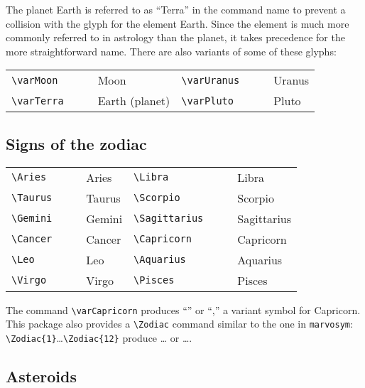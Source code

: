 \documentclass{article}
\newcommand{\showboth}[1]{\starfontsans #1 & \starfontserif #1}
\begin{document}
The planet Earth is referred to as ``Terra'' in the command name to
prevent a collision with the glyph for the element Earth.  Since the
element is much more commonly referred to in astrology than the
planet, it takes precedence for the more straightforward name.  There
are also variants of some of these glyphs:

\begin{tabular}{llll|llll}
\verb|\varMoon| & \showboth{\varMoon} & Moon &
   \verb|\varUranus| & \showboth{\varUranus} & Uranus \\
\verb|\varTerra| & \showboth{\varTerra} & Earth (planet) &
   \verb|\varPluto| & \showboth{\varPluto} & Pluto
\end{tabular}

\subsection{Signs of the zodiac}

\begin{tabular}{llll|llll}
\verb|\Aries| & \showboth{\Aries} & Aries &
   \verb|\Libra| & \showboth{\Libra} & Libra \\
\verb|\Taurus| & \showboth{\Taurus} & Taurus &
   \verb|\Scorpio| & \showboth{\Scorpio} & Scorpio \\
\verb|\Gemini| & \showboth{\Gemini} & Gemini &
   \verb|\Sagittarius| & \showboth{\Sagittarius} & Sagittarius \\
\verb|\Cancer| & \showboth{\Cancer} & Cancer &
   \verb|\Capricorn| & \showboth{\Capricorn} & Capricorn \\
\verb|\Leo| & \showboth{\Leo} & Leo &
   \verb|\Aquarius| & \showboth{\Aquarius} & Aquarius \\
\verb|\Virgo| & \showboth{\Virgo} & Virgo &
   \verb|\Pisces| & \showboth{\Pisces} & Pisces
\end{tabular}

The command
\verb|\varCapricorn| produces ``\varCapricorn'' or
``\starfontserif\varCapricorn,'' a variant symbol for
Capricorn.  This package also
provides a \verb|\Zodiac| command similar to the one in \texttt{marvosym}:
\verb|\Zodiac{1}|\ldots\verb|\Zodiac{12}| produce
\starfontsans{}\ldots{} or
\starfontserif{}\ldots{}.

\subsection{Asteroids}
\end{document}
